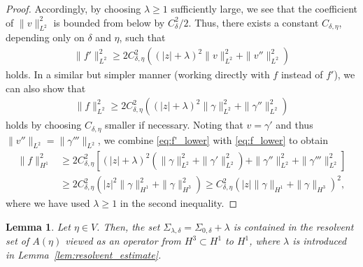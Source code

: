 \documentclass{article}
\newtheorem{lemma}[theorem]{Lemma}
\theoremstyle{remark}
\theoremstyle{definition}
\numberwithin{equation}{section}
\begin{document}
\begin{proof}
Accordingly, by choosing $\lambda\ge1$ sufficiently large, we see that the coefficient of $\|v\|_{L^2}^2$ is bounded from below by $C_\delta^2/2$.
Thus, there exists a constant $C_{\delta,\eta}$, depending only on $\delta$ and $\eta$, such that
\begin{align}
    \|f'\|_{L^2}^2 \ge 2C_{\delta,\eta}^2\left((|z|+\lambda)^2\|v\|_{L^2}^2 + \|v''\|_{L^2}^2\right)
    \label{eq:f'_lower}
\end{align}
holds.
In a similar but simpler manner (working directly with $f$ instead of $f'$), we can also show that
\begin{align}
    \|f\|_{L^2}^2 \ge 2C_{\delta,\eta}^2\left((|z|+\lambda)^2\|\gamma\|_{L^2}^2 + \|\gamma''\|_{L^2}^2\right)
    \label{eq:f_lower}
\end{align}
holds by choosing $C_{\delta,\eta}$ smaller if necessary.
Noting that $v=\gamma'$ and thus $\|v''\|_{L^2} = \|\gamma'''\|_{L^2}$, we combine \eqref{eq:f'_lower} with \eqref{eq:f_lower} to obtain
\begin{align*}
    \|f\|_{H^1}^2
    &\ge2C_{\delta,\eta}^2\left[(|z|+\lambda)^2(\|\gamma\|_{L^2}^2 + \|\gamma'\|_{L^2}^2) + \|\gamma''\|_{L^2}^2 + \|\gamma'''\|_{L^2}^2\right]\\
    &\ge2C_{\delta,\eta}^2\left(|z|^2\|\gamma\|_{H^1}^2 + \|\gamma\|_{H^3}^2\right)
    \ge C_{\delta,\eta}^2\left(|z|\|\gamma\|_{H^1} + \|\gamma\|_{H^3}\right)^2,
\end{align*}
where we have used $\lambda\ge1$ in the second inequality.
\end{proof}

\begin{lemma}
    \label{lem:resolvent_set}
    Let $\eta\in V$.
    Then, the set $\Sigma_{\lambda,\delta}=\Sigma_{0,\delta}+\lambda$ is contained in the resolvent set of $A(\eta)$ viewed as an operator from $H^3\subset H^1$ to $H^1$, where $\lambda$ is introduced in Lemma~\ref{lem:resolvent_estimate}.
\end{lemma}
\end{document}
